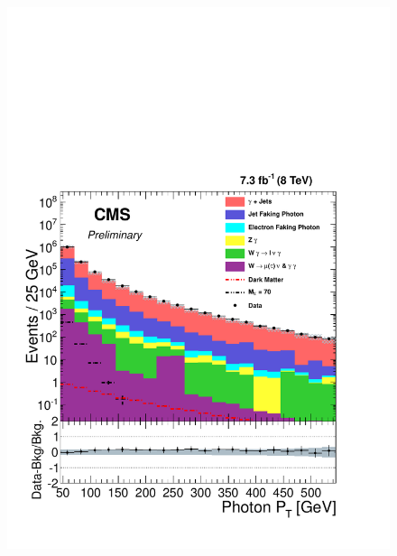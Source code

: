 \begin{figure}[!hp]
\centering
{\includegraphics[scale=0.4]{analysis_figs/QCD_pt.pdf}}

\end{figure}
